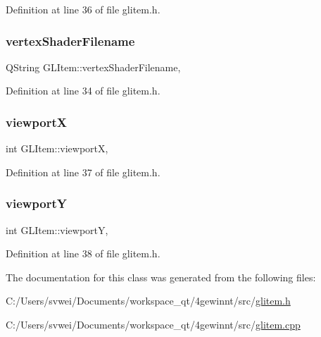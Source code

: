 Definition at line 36 of file glitem.\+h.

\mbox{\label{class_g_l_item_aa18b199e7c5d8a1c0a288dc45b12c8c6}} 
\subsubsection{\texorpdfstring{vertexShaderFilename}{vertexShaderFilename}}
{\footnotesize\ttfamily Q\+String G\+L\+Item\+::vertex\+Shader\+Filename\hspace{0.3cm}{\ttfamily [read]}, {\ttfamily [write]}}



Definition at line 34 of file glitem.\+h.

\mbox{\label{class_g_l_item_a91dc1c10352ee468fd0804162967a2c5}} 
\subsubsection{\texorpdfstring{viewportX}{viewportX}}
{\footnotesize\ttfamily int G\+L\+Item\+::viewportX\hspace{0.3cm}{\ttfamily [read]}, {\ttfamily [write]}}



Definition at line 37 of file glitem.\+h.

\mbox{\label{class_g_l_item_a2703487de4b0843c256861f914b57208}} 
\subsubsection{\texorpdfstring{viewportY}{viewportY}}
{\footnotesize\ttfamily int G\+L\+Item\+::viewportY\hspace{0.3cm}{\ttfamily [read]}, {\ttfamily [write]}}



Definition at line 38 of file glitem.\+h.



The documentation for this class was generated from the following files\+:\begin{DoxyCompactItemize}
\item 
C\+:/\+Users/svwei/\+Documents/workspace\+\_\+qt/4gewinnt/src/\mbox{\hyperlink{glitem_8h}{glitem.\+h}}\item 
C\+:/\+Users/svwei/\+Documents/workspace\+\_\+qt/4gewinnt/src/\mbox{\hyperlink{glitem_8cpp}{glitem.\+cpp}}\end{DoxyCompactItemize}
